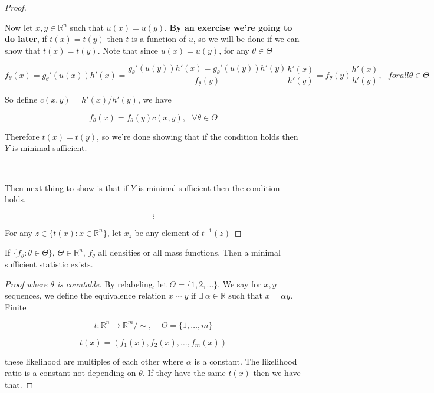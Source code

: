 \begin{proof}
\

Now let \(x, y \in \mathbb{R}^n\) such that \(u(x) = u(y)\). \textbf{By an exercise we're going to do later}, if \(t(x) = t(y)\) then \(t\) is a function of \(u\), so we will be done if we can show that \(t(x) = t(y)\).  Note that  since \(u(x) = u(y)\), for any \(\theta \in \Theta \)

\[
f_\theta(x) = g_\theta'(u(x)) h'(x) = \frac{g_\theta'(u(y))h'(x) = g_\theta'(u(y)) h'(y) }{f_\theta(y)} \frac{h'(x)}{h'(y)} = f_\theta(y) \frac{h'(x)}{h'(y)}, \ \ \ forall \theta \in \Theta
\]

So define \(c(x,y) = h'(x)/h'(y)\), we have 

\[
f_\theta(x) = f_\theta(y) c(x,y), \ \ \ \forall \theta \in \Theta
\]

Therefore \(t(x) = t(y)\), so we're done showing that if the condition holds then \(Y\) is minimal sufficient. 

\

Then next thing to show is that if \(Y\) is minimal sufficient then the condition holds.

\[
\vdots
\]

For any \(z \in \{t(x): x \in \mathbb{R}^n\}\), let \(x_z\) be any element of \(t^{-1}(z)\)

\end{proof}

\begin{proposition} If \(\{f_\theta: \theta \in \Theta\}\), \(\Theta \in \mathbb{R}^n\), \(f_\theta\) all densities or all mass functions. Then a minimal sufficient statistic exists.

\end{proposition}

\begin{proof}[Proof where \(\theta\) is countable] By relabeling, let \(\Theta = \{1, 2, \ldots\}\). We say for \(x, y \) sequences, we define the equivalence relation \(x \sim y \text{ if } \exists \ \alpha \in \mathbb{R} \text{ such that } x = \alpha y\). Finite

\[
t: \mathbb{R}^n \to \mathbb{R}^m/\sim, \ \ \ \ \ \Theta = \{1, \ldots, m\}
\]

\[
t(x) = (f_1(x), f_2(x), \ldots, f_m(x))
\]

these likelihood are multiples of each other where \(\alpha\) is a constant. The likelihood ratio is a constant not depending on \(\theta\). If they have the same \(t(x)\) then we have that.

\end{proof}

